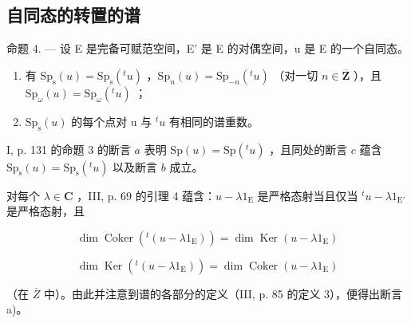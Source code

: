 \subsection{自同态的转置的谱}

命题 4. --- 设 E 是完备可赋范空间，E' 是 E 的对偶空间，u 是 E 的一个自同态。

\begin{enumerate}
\def\labelenumi{\alph{enumi})}
\item
  有 \(\mathrm{Sp}_{\mathrm{s}}(u) = \mathrm{Sp}_{\mathrm{s}}(^{t}u)\) ，\(\mathrm{Sp}_n(u) = \mathrm{Sp}_{-n}(^t u)\) （对一切 \(n \in \overline{\mathbf{Z}}\) ），且 \(\mathrm{Sp}_{\omega}(u) = \mathrm{Sp}_{\omega}(^t u)\) ；
\item
  \(\mathrm{Sp}_{\mathrm{s}}(u)\) 的每个点对 u 与 \({}^{t}u\) 有相同的谱重数。
\end{enumerate}

I, p. 131 的命题 3 的断言 \(a\) 表明 \(\mathrm{Sp}(u) = \mathrm{Sp}({}^{t}u)\) ，且同处的断言 \(c\) 蕴含 \(\mathrm{Sp}_{\mathrm{s}}(u) = \mathrm{Sp}_{\mathrm{s}}({}^{t}u)\) 以及断言 \(b\) 成立。

对每个 \(\lambda \in \mathbf{C}\) ，III, p. 69 的引理 4 蕴含：\(u - \lambda 1_{\mathrm{E}}\) 是严格态射当且仅当 \({}^{t}u - \lambda 1_{\mathrm{E}'}\) 是严格态射，且

\[
\dim \operatorname{Coker} (^ {t} (u - \lambda 1 _ {\mathrm{E}})) = \dim \operatorname{Ker} (u - \lambda 1 _ {\mathrm{E}})
\]

\[
\dim \operatorname{Ker} (^ {t} (u - \lambda 1 _ {\mathrm{E}})) = \dim \operatorname{Coker} (u - \lambda 1 _ {\mathrm{E}})
\]

（在 \(\overline{Z}\) 中）。由此并注意到谱的各部分的定义（III, p. 85 的定义 3），便得出断言 a)。

